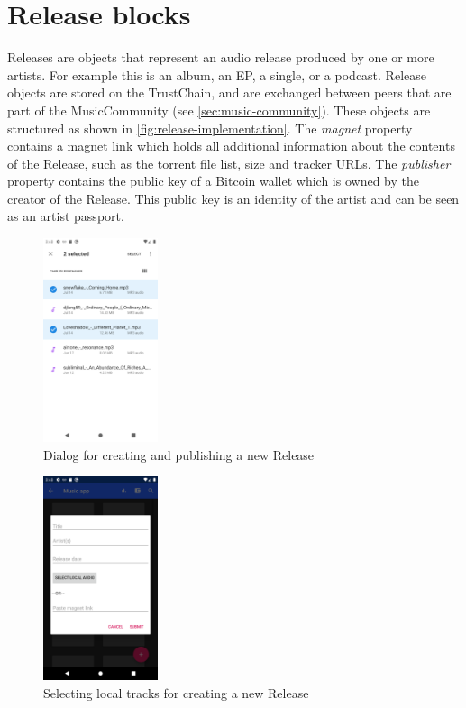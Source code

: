 \section{Release blocks}
Releases are objects that represent an audio release produced by one or more artists. For example this is an album, an EP, a single, or a podcast. Release objects are stored on the TrustChain, and are exchanged between peers that are part of the MusicCommunity (see \ref{sec:music-community}). These objects are structured as shown in \ref{fig:release-implementation}. The \textit{magnet} property contains a magnet link which holds all additional information about the contents of the Release, such as the torrent file list, size and tracker URLs. The \textit{publisher} property contains the public key of a Bitcoin wallet which is owned by the creator of the Release. This public key is an identity of the artist and can be seen as an artist passport.
\begin{figure}
    \centering
    \includegraphics[width=0.3\textwidth]{implementation/screenshot-submit-release.png}
    \caption{Dialog for creating and publishing a new Release}
    \label{fig:submit-release-dialog}
\end{figure}
\begin{figure}
    \centering
    \includegraphics[width=0.3\textwidth]{implementation/screenshot-select-tracks.png}
    \caption{Selecting local tracks for creating a new Release}
    \label{fig:select-tracks}
\end{figure}
